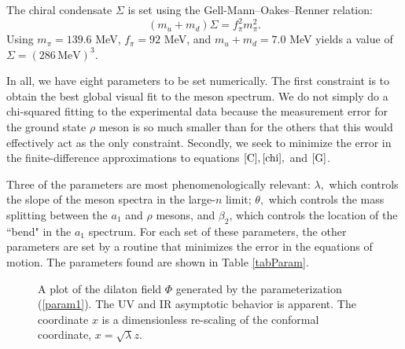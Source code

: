 \documentclass[aps,prd,12pt,nofootinbib]{revtex4}
\newcommand{\be}{\begin{equation}}
\newcommand{\ee}{\end{equation}}
\begin{document}
The chiral condensate $\Sigma$ is set using the Gell-Mann--Oakes--Renner relation:
\be
(m_u+m_d)\Sigma = f_\pi^2 m_\pi^2.
\ee
Using $m_\pi = 139.6$ MeV, $f_\pi = 92 $ MeV, and $m_u+m_d = 7.0 $ MeV yields a value of $\Sigma = (286\, \mathrm{MeV})^3$.

In all, we have eight parameters to be set numerically. 
The first constraint is to obtain the best global visual fit to the meson spectrum. 
We do not simply do a chi-squared fitting to the experimental data because the measurement error for the ground state $\rho$ meson is so much smaller than for the others that this would effectively act as the only constraint. 
Secondly, we seek to minimize the error in the finite-difference approximations to equations $\ref{C}, \ref{chi},$ and $\ref{G}$. 

Three of the parameters are most phenomenologically relevant: $\lambda,$ which controls the slope of the meson spectra in the large-$n$ limit; $\theta,$ which controls the mass splitting between the $a_1$ and $\rho$ mesons, and $\beta_2$, which controls the location of the ``bend" in the $a_1$ spectrum.
For each set of these parameters, the other parameters are set by a routine that minimizes the error in the equations of motion. 
The parameters found are shown in Table \ref{tabParam}.

\begin{figure}[htb]
\caption{A plot of the dilaton field $\Phi$ generated by the parameterization (\ref{param1}).
The UV and IR asymptotic behavior is apparent.
The coordinate $x$ is a dimensionless re-scaling of the conformal coordinate, $x=\sqrt{\lambda}z$.}
\label{figDilaton}
\end{figure}
\end{document}
